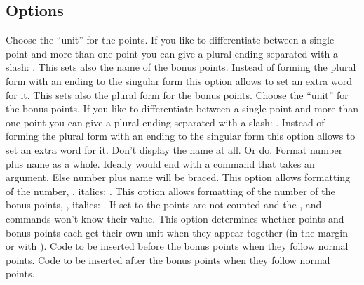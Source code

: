 \documentclass[load-preamble+]{cnltx-doc}
\begin{document}
\subsection{Options}
\begin{options}
    Choose the ``unit'' for the points.  If you like to differentiate between
    a single point and more than one point you can give a plural ending
    separated with a slash: .  This sets also the name of
    the bonus points.
  \Default
    Instead of forming the plural form with an ending to the singular form
    this option allows to set an extra word for it.  This sets also the plural
    form for the bonus points.
    Choose the ``unit'' for the bonus points.  If you like to differentiate
    between a single point and more than one point you can give a plural
    ending separated with a slash: .
  \Default
    Instead of forming the plural form with an ending to the singular form
    this option allows to set an extra word for it.
    Don't display the name at all.  Or do.
    Format number plus name as a whole.  Ideally
     would end with a command that takes an argument.  Else
    number plus name will be braced.
  \Default
    This option allows formatting of the number, \eg, italics:
    .
  \Default
    This option allows formatting of the number of the bonus points, \eg,
    italics: .
    If set to  the points are not counted and the
    ,  and  commands won't know
    their value.
    This option determines whether points and bonus points each get their own
    unit when they appear together (in the margin or with ).
    Code to be inserted before the bonus points when they follow normal
    points.
  \Default{)}
    Code to be inserted after the bonus points when they follow normal
    points.
\end{options}
\end{document}
